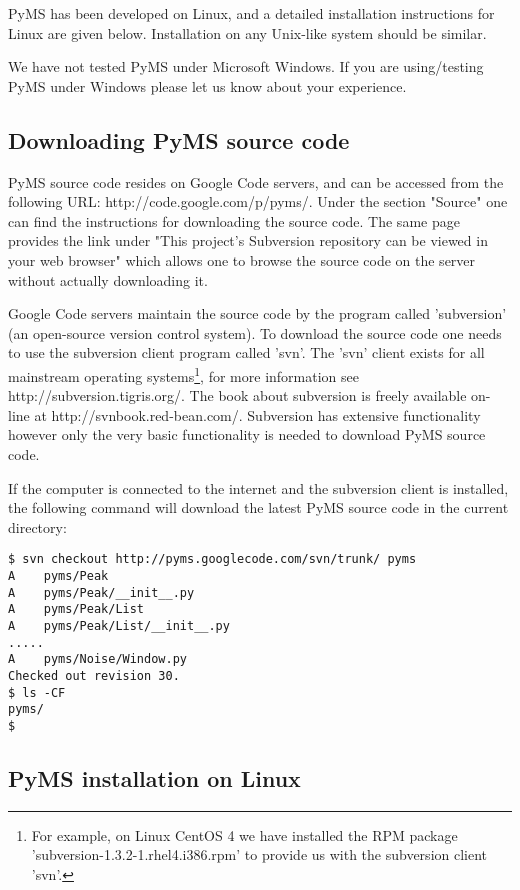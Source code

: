 PyMS has been developed on Linux, and a detailed installation instructions
for Linux are given below. Installation on any Unix-like system should be
similar.

We have not tested PyMS under Microsoft Windows. If you are using/testing
PyMS under Windows please let us know about your experience.

\subsection{Downloading PyMS source code}

PyMS source code resides on Google Code servers, and can be accessed
from the following URL: http://code.google.com/p/pyms/. Under the
section "Source" one can find the instructions for downloading the
source code. The same page provides the link under "This project's
Subversion repository can be viewed in your web browser" which allows
one to browse the source code on the server without actually downloading
it.

Google Code servers maintain the source code by the program called
'subversion' (an open-source version control system).  To download the
source code one needs to use the subversion client program called 'svn'.
The 'svn' client exists for all mainstream operating systems\footnote{For
example, on Linux CentOS 4 we have installed the RPM package
'subversion-1.3.2-1.rhel4.i386.rpm' to provide us with the subversion
client 'svn'.}, for more information see http://subversion.tigris.org/.
The book about subversion is freely available on-line at
http://svnbook.red-bean.com/. Subversion has extensive functionality
however only the very basic functionality is needed to download PyMS
source code.

If the computer is connected to the internet and the subversion client
is installed, the following command will download the latest PyMS 
source code in the current directory:

\begin{verbatim}
$ svn checkout http://pyms.googlecode.com/svn/trunk/ pyms
A    pyms/Peak
A    pyms/Peak/__init__.py
A    pyms/Peak/List
A    pyms/Peak/List/__init__.py
.....
A    pyms/Noise/Window.py
Checked out revision 30.
$ ls -CF
pyms/
$
\end{verbatim}

\subsection{PyMS installation on Linux}

